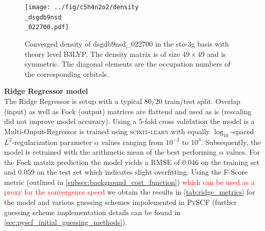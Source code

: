 \begin{figure}[H]
    \centering
    \texttt{[image: ../fig/c5h4n2o2/density\\\_dsgdb9nsd\\\_022700.pdf]}
    \caption[Density matrix of dsgdb9nsd\_022700 in the sto-3g basis with theory level B3LYP]{Converged density of dsgdb9nsd\_022700 in the sto-3g basis with theory level B3LYP. The density matrix is of size $49 \times 49$ and is symmetric. The diagonal elements are the occupation numbers of the corresponding orbitals.}
    \label{fig:density_dsgdb9nsd_022700}
\end{figure}

\textbf{Ridge Regressor model}\\
The Ridge Regressor is setup with a typical $80 / 20$ train/test split. Overlap (input) as well as Fock (output) matrices are flattend and used as is (rescaling did not improve model accuracy). Using a 5-fold cross validation the model is a Multi-Ouput-Regressor is trained using \textsc{scikit-learn} \parencite{ref:sk-learn} with equally $\log_{10}$-spaced $L^2$-regularization parameter $\alpha$ values ranging from $10^{-2}$ to $10^{3}$. Subsequently, the model is retrained with the arithmetic mean of the best performing $\alpha$ values. For the Fock matrix prediction the model yields a RMSE of $0.046$ on the training set and $0.059$ on the test set which indicates slight overfitting. Using the F-Score metric \parencite{ref:Lehtola2019} (outlined in \autoref{subsec:background_cost_function}) \textcolor{red}{which can be used as a proxy for the convergence speed} we obtain the results in \autoref{tab:ridge_metrics} for the model and various guessing schemes impolemented in \textsc{PySCF} (further guessing scheme implementation details can be found in \autoref{sec:pyscf_initial_guessing_methods}).

